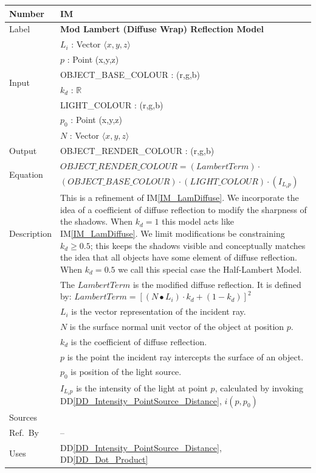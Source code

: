\documentclass[12pt]{article}
\newcommand{\colAwidth}{0.13\textwidth}
\newcommand{\colBwidth}{0.82\textwidth}
\newcommand{\ddref}[1]{DD\ref{#1}}
\newcounter{instnum} %
\newcommand{\iref}[1]{IM\ref{#1}}
\begin{document}
\noindent
\begin{minipage}{\textwidth}
	\renewcommand*{\arraystretch}{1.5}
	\begin{tabular}{| p{\colAwidth} | p{\colBwidth}|}
		\hline
		\rowcolor[gray]{0.9}
		Number& IM{instnum}\theinstnum \label{IM_HalfLam}\\
		\hline
		Label& \bf Mod Lambert (Diffuse Wrap) Reflection Model\\
		\hline
		\multirow{6}{*}{Input}& $L_{i}$ : Vector $\langle x, y, z \rangle$\\
		& $p$ : Point (x,y,z)\\
		& OBJECT\_BASE\_COLOUR : (r,g,b)\\
		& $k_{d}$ : $\mathbb{R}$ \\
		& LIGHT\_COLOUR : (r,g,b)\\
		& $p_{0}$ : Point (x,y,z) \\
		& $N$ : Vector $\langle x, y ,z \rangle$ \\
		\hline
		Output&  OBJECT\_RENDER\_COLOUR : (r,g,b)\\
		\hline
		\multirow{2}{*}{Equation} & $OBJECT\_RENDER\_COLOUR = 
		(LambertTerm)\cdot$\\
		& $(OBJECT\_BASE\_COLOUR)\cdot(LIGHT\_COLOUR)\cdot(I_{L_{i}p})$\\
		\hline
		Description & This is a refinement of \iref{IM_LamDiffuse}. We 
		incorporate the idea of a coefficient of diffuse reflection to modify 
		the sharpness of the shadows. When $k_{d} = 1$ this model acts like 
		\iref{IM_LamDiffuse}. We limit modifications be constraining $k_{d} \ge 
		0.5$; this keeps the shadows visible and conceptually matches the idea 
		that all objects have some element of diffuse reflection. When $k_{d} = 
		0.5$ we call this special case the Half-Lambert Model. \\
		& The $LambertTerm$ is the modified diffuse reflection. It is defined 
		by: $LambertTerm = [(N \bullet L_{i})\cdot k_{d} + (1-k_{d})]^2$\\
		&  $L_{i}$ is the vector representation of the incident 
		ray.\\
		& $N$ is the surface normal unit vector of the object at position 
		$p$. \\
		& $k_{d}$  is the coefficient of diffuse reflection.\\
		& $p$ is the point the incident ray intercepts the surface of an 
		object. \\
		& $p_{0}$ is position of the light source. \\				
		& $I_{L_{i}p}$ is the intensity of the light at point $p$, 
		calculated by invoking \ddref{DD_Intensity_PointSource_Distance}, 
		$i(p, p_{0})$\\
		\hline
		Sources& \cite{Comninos2005,Lengyel2003,shreiner2012} \\
		\hline
		Ref.\ By & -- \\
		\hline
		Uses & \ddref{DD_Intensity_PointSource_Distance}, 
		\ddref{DD_Dot_Product}\\
		\hline
	\end{tabular}
\end{minipage}\\
\end{document}
